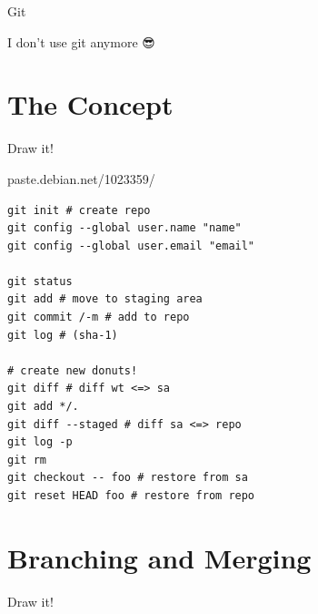 \documentclass[notes,usenames,dvipsnames]{beamer}       %
\begin{document}
\begin{frame}%
  \begin{center}
    \Huge Git
  \end{center}
\end{frame}

\begin{frame}%
  \begin{center}
    \Huge I don't use git anymore 😎
  \end{center}
\end{frame}

\section{The Concept}

\begin{frame}%
  \begin{center}
    \Huge Draw it!
  \end{center}
\end{frame}

\begin{frame}%
  \begin{center}
    \huge paste.debian.net/1023359/
  \end{center}
\end{frame}

\begin{frame}[fragile]%
\begin{verbatim}
git init # create repo
git config --global user.name "name"
git config --global user.email "email"

git status
git add # move to staging area
git commit /-m # add to repo
git log # (sha-1)

# create new donuts!
git diff # diff wt <=> sa
git add */.
git diff --staged # diff sa <=> repo
git log -p
git rm
git checkout -- foo # restore from sa
git reset HEAD foo # restore from repo
\end{verbatim}
\end{frame}

\section{Branching and Merging}

\begin{frame}%
  \begin{center}
    \Huge Draw it!
  \end{center}
\end{frame}
\end{document}
